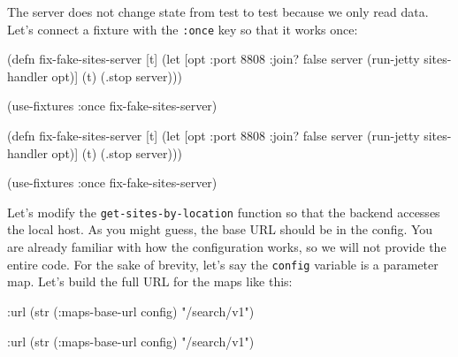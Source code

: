 The server does not change state from test to test because we only read data. Let's connect a fixture with the \verb|:once| key so that it works once:

\ifx\DEVICETYPE\MOBILE

\begin{english}
  \begin{clojure}
(defn fix-fake-sites-server [t]
  (let [opt {:port 8808 :join? false}
        server (run-jetty
                 sites-handler opt)]
    (t)
    (.stop server)))

(use-fixtures :once
  fix-fake-sites-server)
  \end{clojure}
\end{english}

\else

\begin{english}
  \begin{clojure}
(defn fix-fake-sites-server [t]
  (let [opt {:port 8808 :join? false}
        server (run-jetty sites-handler opt)]
    (t)
    (.stop server)))

(use-fixtures :once fix-fake-sites-server)
  \end{clojure}
\end{english}

\fi


\mnoindent
Let's modify the \verb|get-sites-by-location| function so that the backend accesses the local host. As you might guess, the base URL should be in the config. You are already familiar with how the configuration works, so we will not provide the entire code. For the sake of brevity, let's say the \verb|config| variable is a parameter map. Let's build the full URL for the maps like this:

\ifx\DEVICETYPE\MOBILE

\begin{english}
  \begin{clojure}
{:url (str (:maps-base-url config)
        "/search/v1")}
  \end{clojure}
\end{english}

\else

\begin{english}
  \begin{clojure}
{:url (str (:maps-base-url config) "/search/v1")}
  \end{clojure}
\end{english}

